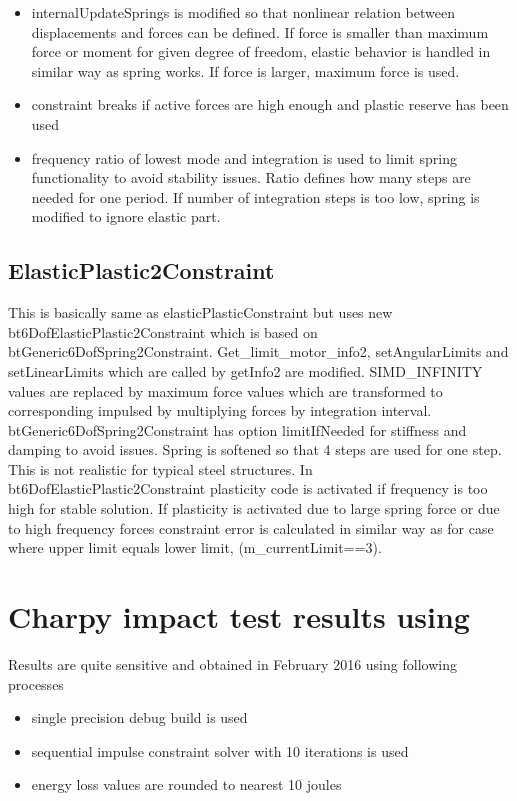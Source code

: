 \begin{itemize}
\item internalUpdateSprings is modified so that nonlinear relation between displacements and forces can be defined. 
 If force is smaller than maximum force or moment for given degree of freedom,
  elastic behavior is handled in similar way as spring works. 
  If force is larger, maximum force is used. 
\item constraint breaks if active forces are high enough and plastic reserve has been used
\item frequency ratio of lowest mode and integration is used to limit spring functionality to avoid stability issues. 
 Ratio defines how many steps are needed for one period. 
 If number of integration steps is too low, spring is modified to ignore elastic part.
\end{itemize}

\subsection{ElasticPlastic2Constraint}
This is basically same as elasticPlasticConstraint but uses new bt6DofElasticPlastic2Constraint 
which is based on btGeneric6DofSpring2Constraint.
Get\_limit\_motor\_info2, setAngularLimits and setLinearLimits which are called by getInfo2 are modified. 
SIMD\_INFINITY values are replaced by maximum force values which are transformed to
corresponding impulsed by multiplying forces by integration interval.
btGeneric6DofSpring2Constraint has option limitIfNeeded for stiffness and damping to avoid issues. 
Spring is softened so that 4 steps are used for one step. This is not realistic for typical steel structures. 
In bt6DofElasticPlastic2Constraint plasticity code is activated if frequency is too high for stable solution.
If plasticity is activated due to large spring force or due to high frequency forces constraint error is 
calculated in similar way as for case where upper limit equals lower limit, (m\_currentLimit==3).

\section{Charpy impact test results using \bullet}
\label{sec:bullet-charpy-results}
Results are quite sensitive and obtained in February 2016 using following processes
\begin{itemize}
\item single precision debug build is used
\item sequential impulse constraint solver with 10 iterations is used
\item energy loss values are rounded to nearest 10 joules 
\end{itemize}

